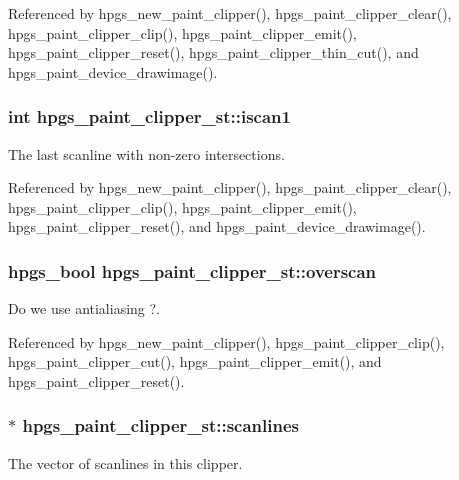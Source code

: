 Referenced by hpgs\_\-new\_\-paint\_\-clipper(), hpgs\_\-paint\_\-clipper\_\-clear(), hpgs\_\-paint\_\-clipper\_\-clip(), hpgs\_\-paint\_\-clipper\_\-emit(), hpgs\_\-paint\_\-clipper\_\-reset(), hpgs\_\-paint\_\-clipper\_\-thin\_\-cut(), and hpgs\_\-paint\_\-device\_\-drawimage().

\subsubsection[{iscan1}]{\setlength{\rightskip}{0pt plus 5cm}int {\bf hpgs\_\-paint\_\-clipper\_\-st::iscan1}}\label{structhpgs__paint__clipper__st_ac2711333e8f5dfc95b6a33f0c4954b6f}
The last scanline with non-\/zero intersections. 

Referenced by hpgs\_\-new\_\-paint\_\-clipper(), hpgs\_\-paint\_\-clipper\_\-clear(), hpgs\_\-paint\_\-clipper\_\-clip(), hpgs\_\-paint\_\-clipper\_\-emit(), hpgs\_\-paint\_\-clipper\_\-reset(), and hpgs\_\-paint\_\-device\_\-drawimage().

\subsubsection[{overscan}]{\setlength{\rightskip}{0pt plus 5cm}hpgs\_\-bool {\bf hpgs\_\-paint\_\-clipper\_\-st::overscan}}\label{structhpgs__paint__clipper__st_ab0fe1dce067b9c2fdbceb38bbe496e02}
Do we use antialiasing ?. 

Referenced by hpgs\_\-new\_\-paint\_\-clipper(), hpgs\_\-paint\_\-clipper\_\-clip(), hpgs\_\-paint\_\-clipper\_\-cut(), hpgs\_\-paint\_\-clipper\_\-emit(), and hpgs\_\-paint\_\-clipper\_\-reset().

\subsubsection[{scanlines}]{$\ast$ {\bf hpgs\_\-paint\_\-clipper\_\-st::scanlines}}\label{structhpgs__paint__clipper__st_a0bb91ce08576e1de31698acf4edb5a53}
The vector of scanlines in this clipper. 

